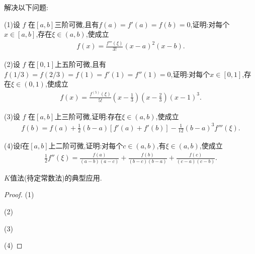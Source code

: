 \documentclass[lang=cn,newtx,10pt,scheme=chinese]{../Template/elegantbook}
\begin{document}
\begin{exercise}
解决以下问题:

(1)设 \( f \) 在\([a, b]\)三阶可微,且有\( f(a) = f'(a) = f(b) = 0\),证明:对每个\( x \in [a, b]\),存在\( \xi \in (a, b)\),使成立
\begin{align}
   f(x) = \frac{f'''(\xi)}{3!}(x - a)^2(x - b)
   .\nonumber
\end{align}

(2)设 \( f \) 在\([0, 1]\)上五阶可微,且有\( f(1/3) = f(2/3) = f(1) = f'(1) = f''(1) = 0\),证明:对每个\( x \in [0, 1]\),存在\( \xi \in (0, 1)\),使成立
\begin{align}
   f(x) = \frac{f^{(5)}(\xi)}{5!}\left(x - \frac{1}{3}\right)\left(x - \frac{2}{3}\right)(x - 1)^3
   .\nonumber
\end{align}

(3)设 \( f \) 在\([a, b]\)上三阶可微,证明:存在\( \xi \in (a, b)\),使成立
\begin{align}
   f(b) = f(a) + \frac{1}{2}(b - a)[f'(a) + f'(b)] - \frac{1}{12}(b - a)^3f'''(\xi)
   .\nonumber
\end{align}

(4)设f在$[a,b]$上二阶可微,证明:对每个$c\in(a,b)$,有$\xi\in(a,b)$,使成立
\begin{align}
    \frac{1}{2}f''(\xi)=\frac{f(a)}{(a-b)(a-c)}+\frac{f(b)}{(b-c)(b-a)}+\frac{f(c)}{(c-a)(c-b)}.
    \nonumber
\end{align}
\end{exercise}
\begin{note}
    $K$值法(待定常数法)的典型应用.
\end{note}
\begin{proof}
        (1)

        (2)

        (3)

        (4)
\end{proof}
\end{document}
